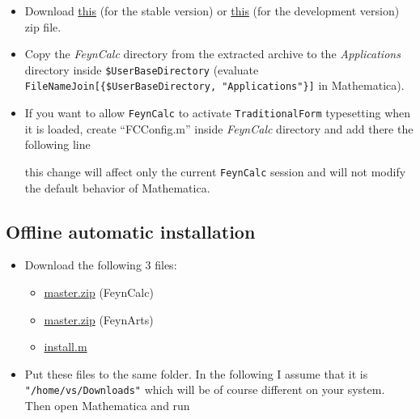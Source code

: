 \documentclass[../FeynCalcManual.tex]{subfiles}
\begin{document}
\begin{itemize}
\item
  Download
  \href{https://github.com/FeynCalc/feyncalc/archive/hotfix-stable.zip}{this}
  (for the stable version) or
  \href{https://github.com/FeynCalc/feyncalc/archive/master.zip}{this}
  (for the development version) zip file.
\item
  Copy the \emph{FeynCalc} directory from the extracted archive to the
  \emph{Applications} directory inside \texttt{\$UserBaseDirectory}
  (evaluate
  \texttt{FileNameJoin[\allowbreak{}\{\allowbreak{}\$UserBaseDirectory,\ \allowbreak{}"Applications"\}]}
  in Mathematica).
\item
  If you want to allow \texttt{FeynCalc} to activate
  \texttt{TraditionalForm} typesetting when it is loaded, create
  ``FCConfig.m'' inside \emph{FeynCalc} directory and add there the
  following line

\begin{Shaded}
\begin{Highlighting}[]
\ExtensionTok{=}\NormalTok{;}
\end{Highlighting}
\end{Shaded}

  this change will affect only the current \texttt{FeynCalc} session and
  will not modify the default behavior of Mathematica.
\end{itemize}

\subsection{Offline automatic
installation}\label{offline-automatic-installation}

\begin{itemize}
\item
  Download the following 3 files:

  \begin{itemize}
  \tightlist
  \item
    \href{https://github.com/FeynCalc/feyncalc/archive/master.zip}{master.zip}
    (FeynCalc)
  \item
    \href{https://github.com/FeynCalc/feynarts-mirror/archive/master.zip}{master.zip}
    (FeynArts)
  \item
    \href{https://github.com/FeynCalc/feyncalc/raw/master/install.m}{install.m}
  \end{itemize}
\item
  Put these files to the same folder. In the following I assume that it
  is \texttt{"/home/vs/Downloads"} which will be of course different on
  your system. Then open Mathematica and run
\end{itemize}
\end{document}
